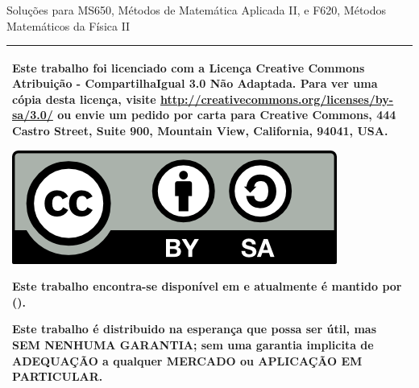 % 
% 
% 
% 
% 
% 
%
%
\begin{center}
    \LARGE{Soluções para MS650, Métodos de Matemática Aplicada II, e F620, Métodos Matemáticos da F\'{i}sica II}
    
    \Large{\mycheader}
\end{center}
\vspace{.5\textheight}

\begin{tabular}{|p{}|}
\hline
Este trabalho foi licenciado com a Licença Creative Commons Atribuição - CompartilhaIgual 3.0 Não Adaptada. Para ver uma c\'{o}pia desta licença, visite \url{http://creativecommons.org/licenses/by-sa/3.0/} ou envie um pedido por carta para Creative Commons, 444 Castro Street, Suite 900, Mountain View, California, 94041, USA.
\begin{center}
\includegraphics[scale=1]{cc-by-sa.png}
\end{center}
Este trabalho encontra-se dispon\'{i}vel em  e atualmente é mantido por  ().

Este trabalho é distribuido na esperança que possa ser \'{u}til, mas SEM NENHUMA GARANTIA; sem uma garantia implicita de ADEQUA\c{C}\~{A}O a qualquer MERCADO ou APLICA\c{C}\~{A}O EM PARTICULAR.
\\ \hline
\end{tabular}
